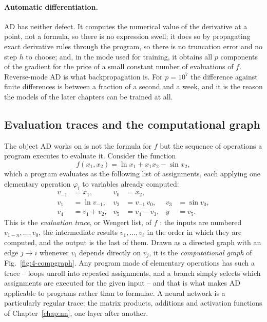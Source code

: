 \paragraph{Automatic differentiation.}
AD has neither defect.  It computes the numerical value of the derivative at a
point, not a formula, so there is no expression swell; it does so by
propagating exact derivative rules through the program, so there is no
truncation error and no step $h$ to choose; and, in the mode used for
training, it obtains all $p$ components of the gradient for the price of a
small constant number of evaluations of $f$.  Reverse-mode AD is what
backpropagation is.  For $p=10^{7}$ the difference against finite differences
is between a fraction of a second and a week, and it is the reason the models
of the later chapters can be trained at all.

\subsection{Evaluation traces and the computational graph}
\label{sec:adtrace}

The object AD works on is not the formula for $f$ but the sequence of
operations a program executes to evaluate it.  Consider the function
\begin{equation}
  f(x_1,x_2) = \ln x_1 + x_1x_2 - \sin x_2 ,
  \label{eq:4-adexample}
\end{equation}
which a program evaluates as the following list of assignments, each applying
one elementary operation $\varphi_i$ to variables already computed:
\begin{equation}
  \begin{aligned}
    v_{-1} &= x_1, & v_0 &= x_2, \\
    v_1 &= \ln v_{-1}, & v_2 &= v_{-1}\,v_0, & v_3 &= \sin v_0, \\
    v_4 &= v_1 + v_2, & v_5 &= v_4 - v_3, & y &= v_5 .
  \end{aligned}
  \label{eq:4-adtrace}
\end{equation}
This is the \emph{evaluation trace}, or Wengert list, of $f$
\cite{wengert1964,griewank2008}: the inputs are numbered $v_{1-n},\dots,v_0$,
the intermediate results $v_1,\dots,v_\ell$ in the order in which they are
computed, and the output is the last of them.  Drawn as a directed graph with
an edge $j\to i$ whenever $v_i$ depends directly on $v_j$, it is the
\emph{computational graph} of Fig.~\ref{fig:4-compgraph}.  Any program made
of elementary operations has such a trace -- loops unroll into repeated
assignments, and a branch simply selects which assignments are executed for
the given input -- and that is what makes AD applicable to programs rather
than to formulae.  A neural network is a particularly regular trace: the
matrix products, additions and activation functions of Chapter~\ref{chap:nn},
one layer after another.

